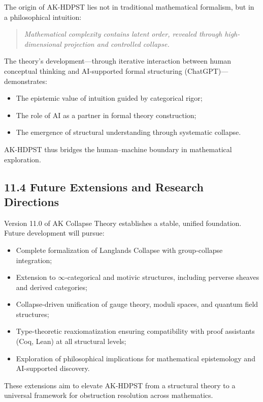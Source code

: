 \documentclass[11pt]{article}
\begin{document}
The origin of AK-HDPST lies not in traditional mathematical formalism, but in a philosophical intuition:

\begin{quote}
\textit{Mathematical complexity contains latent order, revealed through high-dimensional projection and controlled collapse.}
\end{quote}

The theory's development—through iterative interaction between human conceptual thinking and AI-supported formal structuring (ChatGPT)—demonstrates:

\begin{itemize}
    \item The epistemic value of intuition guided by categorical rigor;
    \item The role of AI as a partner in formal theory construction;
    \item The emergence of structural understanding through systematic collapse.
\end{itemize}

AK-HDPST thus bridges the human–machine boundary in mathematical exploration.

\subsection*{11.4 Future Extensions and Research Directions}

Version 11.0 of AK Collapse Theory establishes a stable, unified foundation. Future development will pursue:

\begin{itemize}
    \item Complete formalization of Langlands Collapse with group-collapse integration;
    \item Extension to \(\infty\)-categorical and motivic structures, including perverse sheaves and derived categories;
    \item Collapse-driven unification of gauge theory, moduli spaces, and quantum field structures;
    \item Type-theoretic reaxiomatization ensuring compatibility with proof assistants (Coq, Lean) at all structural levels;
    \item Exploration of philosophical implications for mathematical epistemology and AI-supported discovery.
\end{itemize}

These extensions aim to elevate AK-HDPST from a structural theory to a universal framework for obstruction resolution across mathematics.
\end{document}
